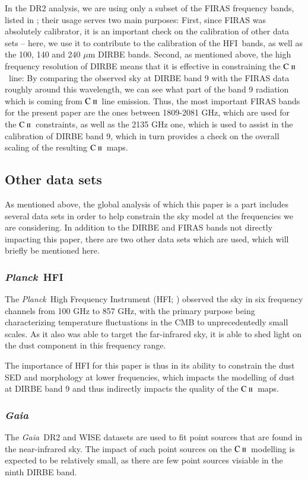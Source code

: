 \documentclass{aa}
\newcommand{\mathsc}[1]{{\normalfont\textsc{#1}}}
\def\Planck{\textit{Planck}}
\def\Gaia{\textit{Gaia}}
\def\WISE{WISE}
\newcommand{\cii}{\ensuremath{\mathsc {C\ ii}}}
\newcommand{\hfi}[0]{HFI}
\begin{document}
In the DR2 analysis, we are using only a subset of the FIRAS frequency bands,
listed in \citet{CG02_01}; their usage serves two main purposes: First, since
FIRAS was absolutely calibrator, it is an important check on the calibration of
other data sets -- here, we use it to contribute to the calibration of the
\hfi\ bands, as well as the 100, 140 and 240 $\mu$m DIRBE bands. Second, as
mentioned above, the high frequency resolution of DIRBE means that it is
effective in constraining the \cii\ line: By comparing the observed sky at
DIRBE band 9 with the FIRAS data roughly around this wavelength, we can see
what part of the band 9 radiation which is coming from \cii\ line emission.
Thus, the most important FIRAS bands for the present paper are the ones between
1809-2081 GHz, which are used for the \cii\ constraints, as well as the 2135
GHz one, which is used to assist in the calibration of DIRBE band 9, which in
turn provides a check on the overall scaling of the resulting \cii\ maps.

\subsection{Other data sets}
As mentioned above, the global analysis of which this paper is a part includes
several data sets in order to help constrain the sky model at the frequencies
we are considering. In addition to the DIRBE and FIRAS bands not directly
impacting this paper, there are two other data sets which are used, which will
briefly be mentioned here.

\subsubsection{\Planck\ HFI}
The \Planck\ High Frequency Instrument (HFI; \citealt{planck2016-l03}) observed
the sky in six frequency channels from 100 GHz to 857 GHz, with the primary
purpose being characterizing temperature fluctuations in the CMB to
unprecedentedly small scales. As it also was able to target the far-infrared
sky, it is able to shed light on the dust component in this frequency range.

The importance of HFI for this paper is thus in its ability to constrain the
dust SED and morphology at lower frequencies, which impacts the modelling of
dust at DIRBE band 9 and thus indirectly impacts the quality of the \cii\ maps.

\subsubsection{\Gaia}
The \Gaia\ DR2 \citep{gaia:2016,gaia:2018} and \WISE \citep{wright:2010}
datasets are used to fit point sources that are found in the near-infrared sky.
The impact of such point sources on the \cii\ modelling is expected to be
relatively small, as there are few point sources visiable in the ninth DIRBE
band.
\end{document}
